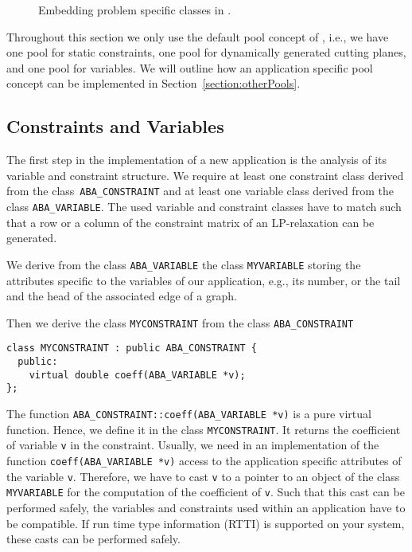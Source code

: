 \begin{figure}
\centerline{
}
\caption{Embedding problem specific classes in \ABACUS.}
\label{figure:derive}
\end{figure}


Throughout this section we only use the default pool concept of \ABACUS,
i.e., we have one pool for static constraints, one pool for
dynamically generated cutting planes,
and one pool for variables. We will outline how an application specific
pool concept can be implemented in Section~\ref{section:otherPools}.

\subsection{Constraints and Variables}

The first step in the implementation of a new application is the analysis
of its variable and constraint structure. We require at least one
constraint class derived from the 
class~{\tt ABA\_CONSTRAINT} and at least one
variable class derived from the class {\tt ABA\_VARIABLE}. 
The used variable
and constraint classes have to match such that a row or a column
of the constraint matrix of an LP-relaxation can be generated.

We derive from the class {\tt ABA\_VARIABLE} the class {\tt MYVARIABLE} storing
the attributes specific to the variables of our application, e.g.,
its number, or the tail and the head of the associated edge of a graph.

Then we derive the class {\tt MYCONSTRAINT} from the class
{\tt ABA\_CONSTRAINT}
\begin{verbatim}
class MYCONSTRAINT : public ABA_CONSTRAINT {
  public:
    virtual double coeff(ABA_VARIABLE *v);
};
\end{verbatim}
The function {\tt  ABA\_CONSTRAINT::coeff(ABA\_VARIABLE *v)}
is a pure virtual function. Hence, we define it in the class
{\tt MYCONSTRAINT}. It returns the coefficient of variable {\tt v}
in the constraint.
Usually, we need in an implementation of the function
{\tt coeff(ABA\_VARIABLE *v)}
access to the application specific attributes of the variable {\tt v}.
Therefore, we have to cast {\tt v} to a pointer to an object of the 
class {\tt MYVARIABLE} for the computation of the coefficient of {\tt v}.
Such that this cast can be performed safely, the variables and constraints
used within an application have to be compatible. If run time type
information (RTTI) is supported
on your system, these casts can be performed safely.

